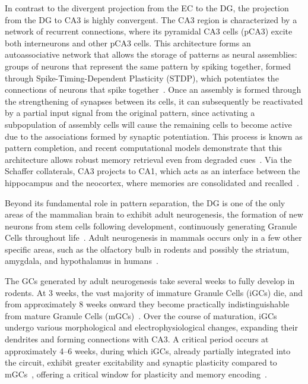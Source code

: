 In contrast to the divergent projection from the EC to the DG, the projection from the DG to CA3 is highly convergent. The CA3
region is characterized by a network of recurrent connections, where its pyramidal CA3 cells (pCA3) excite both interneurons and
other pCA3 cells. This architecture forms an autoassociative network that allows the storage of patterns as neural assemblies:
groups of neurons that represent the same pattern by spiking together, formed through Spike-Timing-Dependent Plasticity (STDP),
which potentiates the connections of neurons that spike together~\parencite{kopsickFormation2024}. Once an assembly is formed through
the strengthening of synapses between its cells, it can subsequently be reactivated by a partial input signal from the original
pattern, since activating a subpopulation of assembly cells will cause the remaining cells to become active due to the
associations formed by synaptic potentiation. This process is known as pattern completion, and recent computational models
demonstrate that this architecture allows robust memory retrieval even from degraded cues~\parencite{kopsickFormation2024,
leduigouRecurrent2014}. Via the Schaffer collaterals, CA3 projects to CA1, which acts as an interface between the hippocampus
and the neocortex, where memories are consolidated and recalled~\parencite{bartschCA12011}.

Beyond its fundamental role in pattern separation, the DG is one of the only areas of the mammalian brain to exhibit adult
neurogenesis, the formation of new neurons from stem cells following development, continuously generating Granule Cells throughout
life~\parencite{boldriniHuman2018, dumitruIdentification2025}. Adult neurogenesis in mammals occurs only in a few other specific
areas, such as the olfactory bulb in rodents and possibly the striatum, amygdala, and hypothalamus in
humans~\parencite{alonsoImpact2024, jurkowskiHippocampus2020}.

The GCs generated by adult neurogenesis take several weeks to fully develop in rodents. At 3 weeks, the vast majority of
immature Granule Cells (iGCs) die, and from approximately 8 weeks onward they become practically indistinguishable from mature
Granule Cells (mGCs)~\parencite{denoth-lippunerFormation2021}. Over the course of maturation, iGCs undergo various morphological and
electrophysiological changes, expanding their dendrites and forming connections with CA3. A critical period occurs at
approximately 4--6 weeks, during which iGCs, already partially integrated into the circuit, exhibit greater excitability and
synaptic plasticity compared to mGCs~\parencite{zhaoDistinct2006, denoth-lippunerFormation2021, aimoneRegulation2014}, offering a
critical window for plasticity and memory encoding~\parencite{berdugo-vegaSharpening2023}.

